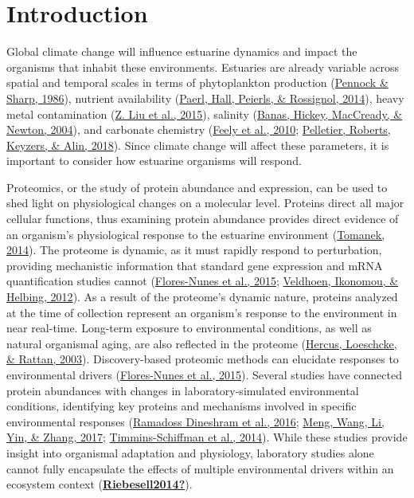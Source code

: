 \documentclass [11pt, proquest] {uwthesis}[2015/03/03]
\begin{document}
\hypertarget{introduction-1}{%
\section{Introduction}\label{introduction-1}}

Global climate change will influence estuarine dynamics and impact the organisms that inhabit these environments. Estuaries are already variable across spatial and temporal scales in terms of phytoplankton production (\protect\hyperlink{ref-Pennock1986}{Pennock \& Sharp, 1986}), nutrient availability (\protect\hyperlink{ref-Paerl2014}{Paerl, Hall, Peierls, \& Rossignol, 2014}), heavy metal contamination (\protect\hyperlink{ref-Liu2015}{Z. Liu et al., 2015}), salinity (\protect\hyperlink{ref-Banas2004}{Banas, Hickey, MacCready, \& Newton, 2004}), and carbonate chemistry (\protect\hyperlink{ref-Feely2010}{Feely et al., 2010}; \protect\hyperlink{ref-Pelletier2018}{Pelletier, Roberts, Keyzers, \& Alin, 2018}). Since climate change will affect these parameters, it is important to consider how estuarine organisms will respond.

Proteomics, or the study of protein abundance and expression, can be used to shed light on physiological changes on a molecular level. Proteins direct all major cellular functions, thus examining protein abundance provides direct evidence of an organism's physiological response to the estuarine environment (\protect\hyperlink{ref-Tomanek2014}{Tomanek, 2014}). The proteome is dynamic, as it must rapidly respond to perturbation, providing mechanistic information that standard gene expression and mRNA quantification studies cannot (\protect\hyperlink{ref-Flores-Nunes2015}{Flores-Nunes et al., 2015}; \protect\hyperlink{ref-Veldhoen2012}{Veldhoen, Ikonomou, \& Helbing, 2012}). As a result of the proteome's dynamic nature, proteins analyzed at the time of collection represent an organism's response to the environment in near real-time. Long-term exposure to environmental conditions, as well as natural organismal aging, are also reflected in the proteome (\protect\hyperlink{ref-Hercus2003}{Hercus, Loeschcke, \& Rattan, 2003}). Discovery-based proteomic methods can elucidate responses to environmental drivers (\protect\hyperlink{ref-Flores-Nunes2015}{Flores-Nunes et al., 2015}). Several studies have connected protein abundances with changes in laboratory-simulated environmental conditions, identifying key proteins and mechanisms involved in specific environmental responses (\protect\hyperlink{ref-Dineshram2016}{Ramadoss Dineshram et al., 2016}; \protect\hyperlink{ref-Meng2017}{Meng, Wang, Li, Yin, \& Zhang, 2017}; \protect\hyperlink{ref-Timmins-Schiffman2014}{Timmins-Schiffman et al., 2014}). While these studies provide insight into organismal adaptation and physiology, laboratory studies alone cannot fully encapsulate the effects of multiple environmental drivers within an ecosystem context (\protect\hyperlink{ref-Riebesell2014}{\textbf{Riebesell2014?}}).
\end{document}
